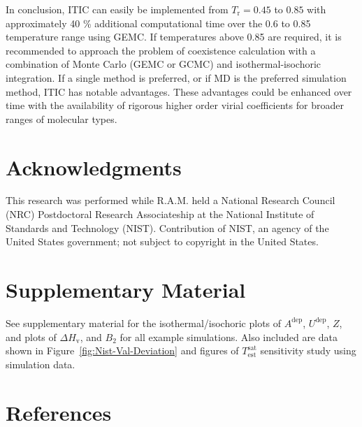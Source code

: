 \documentclass[5p,times]{elsarticle}
\begin{document}
In conclusion, ITIC can easily be implemented from $T_\mathrm{r} = 0.45$ to $0.85$ with approximately 40 \% additional computational time over the 0.6 to 0.85 temperature range using GEMC. If temperatures above 0.85 are required, it is recommended to approach the problem of coexistence calculation with a combination of Monte Carlo (GEMC or GCMC) and isothermal-isochoric integration. If a single method is preferred, or if MD is the preferred simulation method, ITIC has notable advantages. These advantages could be enhanced over time with the availability of rigorous higher order virial coefficients for broader ranges of molecular types. 

\section{Acknowledgments}

This research was performed while R.A.M. held a National Research Council (NRC) Postdoctoral Research Associateship at the National Institute of Standards and Technology (NIST). Contribution of NIST, an agency of the United States government; not subject to copyright in the United States.

\section{Supplementary Material} \label{sec:SupMat} 
See supplementary material for 
the isothermal/isochoric plots of $A^{\mathrm{dep}}$, $U^{\mathrm{dep}}$, $Z$, and plots of $\Delta H_{\mathrm{v}}$, and $B_2$ for all example simulations. Also included are data shown in Figure~\ref{fig:Nist-Val-Deviation} and figures of $T^\mathrm{sat}_\mathrm{est}$ sensitivity study using simulation data.
\section{References} \label{sec:ref} 



\end{document}
